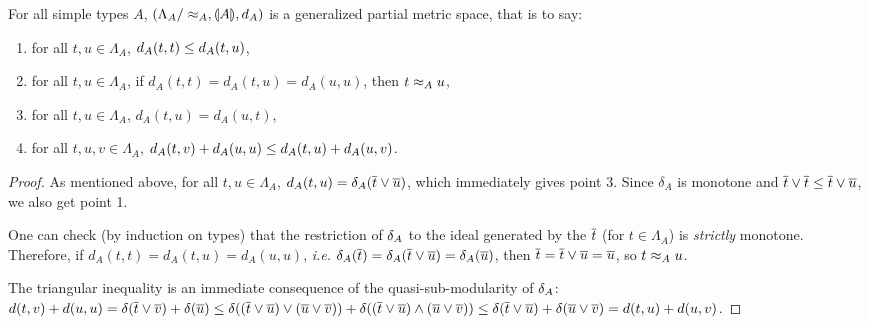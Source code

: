 \begin{corollary} \label{corollary:stlc-metric} For all simple types $A$, $\left(\Lambda_A/\approx_A, \llparenthesis A \rrparenthesis, d_A\right)$ is a generalized partial metric space, that is to say:
\begin{enumerate}
\item for all $t,u \in \Lambda_A$, $d_A(t,t) \leq d_A(t,u)$,
\item for all $t,u \in \Lambda_A$, if $d_A(t,t) = d_A(t,u) = d_A(u,u)$, then $t \approx_A u$,
\item for all $t,u \in \Lambda_A$, $d_A(t,u) = d_A(u,t)$,
\item for all $t,u,v \in \Lambda_A$, $d_A(t,v) + d_A(u,u) \leq d_A(t,u) + d_A(u,v)$.
\end{enumerate}
\end{corollary}
\begin{proof}
As mentioned above, for all $t,u\in\Lambda_A$, $d_A(t,u) = \delta_A(\overline{t} \vee \overline{u})$, which immediately gives point 3. Since $\delta_A$ is monotone and $\overline{t} \vee \overline{t} \leq \overline{t} \vee \overline{u}$, we also get point 1.

One can check (by induction on types) that the restriction of $\delta_A$ to the ideal generated by the $\overline{t}$ (for $t \in \Lambda_A$) is \emph{strictly} monotone. Therefore, if  $d_A(t,t) = d_A(t,u) = d_A(u,u)$, \textit{i.e.} $\delta_A(\overline{t}) = \delta_A(\overline{t} \vee \overline{u}) = \delta_A(\overline{u})$,  then $\overline{t} = \overline{t} \vee \overline{u} = \overline{u}$, so $t \approx_A u$.

The triangular inequality is an immediate consequence of the quasi-sub-modularity of $\delta_A$: $d(t,v) + d(u,u) = \delta(\overline{t} \vee \overline{v}) + \delta(\overline{u}) \leq \delta((\overline{t} \vee \overline{u}) \vee (\overline{u} \vee \overline{v})) + \delta((\overline{t} \vee \overline{u}) \wedge (\overline{u} \vee \overline{v})) \leq \delta(\overline{t} \vee  \overline{u}) + \delta(\overline{u} \vee  \overline{v}) = d(t,u) + d(u,v)$.
\end{proof}

